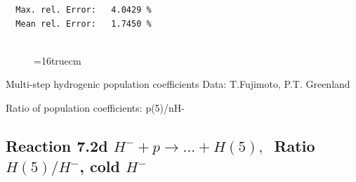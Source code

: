 \documentclass[12pt,dvips]{article}
\begin{document}
\begin{small}
\begin{verbatim}
  Max. rel. Error:   4.0429 %
  Mean rel. Error:   1.7450 %


\end{verbatim}\end{small}
\begin{figure} \label{7.2c}
\epsfxsize=16truecm
\end{figure}
\newpage

 Multi-step hydrogenic population coefficients
 Data: T.Fujimoto, P.T. Greenland

 Ratio of population coefficients: p(5)/nH-

\subsection{
Reaction 7.2d $ H^- + p \rightarrow ...+ H(5) , \  $
Ratio $H(5)/H^- $, cold $H^-$
}
\end{document}
